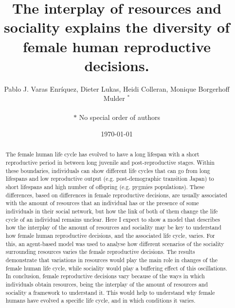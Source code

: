 \documentclass{article}
\title{The interplay of resources and sociality explains the diversity of female human reproductive decisions.}
\author{Pablo J. Varas Enríquez, Dieter Lukas, Heidi Colleran, Monique Borgerhoff Mulder $^*$\\\\
$*$ No special order of authors}
\date{\today}
\begin{document}
\maketitle

\begin{abstract}
    The female human life cycle has evolved to have a long lifespan with a short reproductive period in between long juvenile and post-reproductive stages. Within these boundaries, individuals can show different  life cycles that can go from long lifespans and low reproductive output (e.g. post-demographic transition Japan) to short lifespans and high number of offspring (e.g. pygmies populations). These differences, based on differences in female reproductive decisions, are usually associated with the amount of resources that an individual has or the presence of some individuals in their social network, but how the link of both of them change the life cycle of an individual remains unclear. Here I expect to show a model that describes how the interplay of the amount of resources and sociality may be key to understand how female human reproductive decisions, and the associated life cycle, varies. For this, an agent-based model was used to analyse how different scenarios of the sociality surrounding resources varies the female reproductive decisions. The results demonstrate that variations in resources would play the main role in changes of the female human life cycle, while sociality would play a buffering effect of this oscillations. In conclusion, female reproductive decisions vary because of the ways in which individuals obtain resources, being the interplay of the amount of resources and sociality a framework to understand it. This would help to understand why female humans have evolved a specific life cycle, and in which conditions it varies.
\end{abstract}
\end{document}
